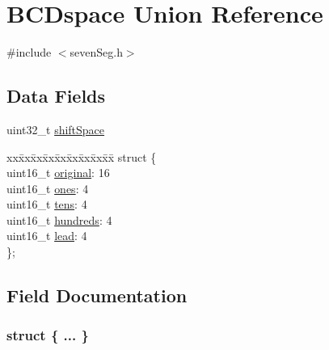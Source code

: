\hypertarget{union_b_c_dspace}{}\section{B\+C\+Dspace Union Reference}
\label{union_b_c_dspace}


{\ttfamily \#include $<$seven\+Seg.\+h$>$}

\subsection*{Data Fields}
\begin{DoxyCompactItemize}
\item 
uint32\+\_\+t \hyperlink{union_b_c_dspace_a766089344203b4d7391ede75e6d896b8}{shift\+Space}
\item 
\begin{tabbing}
xx\=xx\=xx\=xx\=xx\=xx\=xx\=xx\=xx\=\kill
struct \{\\
\>uint16\_t \hyperlink{union_b_c_dspace_a837b0ee13fe5df2c6154d9cd0b1e4cab}{original}: 16\\
\>uint16\_t \hyperlink{union_b_c_dspace_af4c34c481c478daf8ff3fb4e59785f3e}{ones}: 4\\
\>uint16\_t \hyperlink{union_b_c_dspace_ab009def89f5ae63afa966be922b69bca}{tens}: 4\\
\>uint16\_t \hyperlink{union_b_c_dspace_a337f8d89d05b6efe86bf48a732908f14}{hundreds}: 4\\
\>uint16\_t \hyperlink{union_b_c_dspace_af5ce88c180fdba2e4c3ca367c17f9b42}{lead}: 4\\
\}; \\

\end{tabbing}\end{DoxyCompactItemize}


\subsection{Field Documentation}
\hypertarget{union_b_c_dspace_adbcbaca8c462b8d9fc1357bc851b18cb}{}\subsubsection[{"@1}]{\setlength{\rightskip}{0pt plus 5cm}struct \{ ... \} }\label{union_b_c_dspace_adbcbaca8c462b8d9fc1357bc851b18cb}
\hypertarget{union_b_c_dspace_a337f8d89d05b6efe86bf48a732908f14}{}
